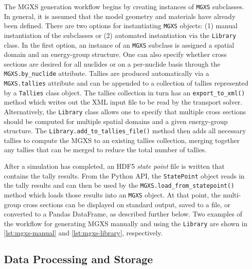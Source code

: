 The MGXS generation workflow begins by creating instances of \texttt{MGXS} subclasses. In general, it is assumed that the model geometry and materials have already been defined. There are two options for instantiating \texttt{MGXS} objects: (1) manual instantiation of the subclasses or (2) automated instantiation via the \texttt{Library} class. In the first option, an instance of an \texttt{MGXS} subclass is assigned a spatial domain and an energy-group structure. One can also specify whether cross sections are desired for all nuclides or on a per-nuclide basis through the \texttt{MGXS.by_nuclide} attribute. Tallies are produced automatically via a \texttt{MGXS.tallies} attribute and can be appended to a collection of tallies represented by a \texttt{Tallies} class object. The tallies collection in turn has an \texttt{export_to_xml()} method which writes out the XML input file to be read by the transport solver. Alternatively, the \texttt{Library} class allows one to specify that multiple cross sections should be computed for multiple spatial domains and a given energy-group structure. The \texttt{Library.add_to_tallies_file()} method then adds all necessary tallies to compute the MGXS to an existing tallies collection, merging together any tallies that can be merged to reduce the total number of tallies.

After a simulation has completed, an HDF5 \emph{state point} file is written
that contains the tally results. From the Python API, the \texttt{StatePoint}
object reads in the tally results and can then be used by the
\texttt{MGXS.load_from_statepoint()} method which loads those results into an
\texttt{MGXS} object. At that point, the multi-group cross sections can be displayed on standard output, saved to a file, or converted to a Pandas DataFrame, as described further below. Two examples of the workflow for generating MGXS manually and using the \texttt{Library} are shown in \cref{lst:mgxs-manual} and \cref{lst:mgxs-library}, respectively.






\subsection{Data Processing and Storage}
\label{subsec:data-processing}

